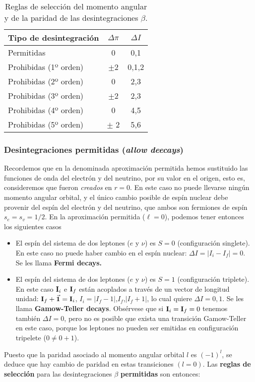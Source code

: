\begin{table}[h!]\centering
	\begin{tabular}{|l||c|c|}\hline
		Tipo de desintegración & $\Delta \pi$ & $\Delta I$ \\ \hline \hline
		Permitidas & 0 & 0,1 \\ \hline 
		Prohibidas (1º orden) & $\pm$2 & 0,1,2 \\ \hline
		Prohibidas (2º orden) & 0 & 2,3 \\ 	\hline	
		Prohibidas (3º orden) & $\pm$2 & 2,3 \\ \hline	
		Prohibidas (4º orden) & 0 & 4,5 \\ 	\hline	
		Prohibidas (5º orden) & $\pm$ 2 & 5,6  \\		 \hline
	\end{tabular}
	\caption{Reglas de selección del momento angular y de la paridad de las desintegraciones $\beta$.}
	\label{Tab:02-02-01}
\end{table}


\subsubsection{Desintegraciones permitidas (\textit{allow deecays})}


Recordemos que en la denominada aproximación permitida hemos sustituido las funciones de onda del electrón y del neutrino, por su valor en el origen, esto es, consideremos que fueron \textit{creados} en $r=0$. En este caso no puede llevarse ningún momento angular orbital, y el único cambio posible de espín nuclear debe provenir del espín del electrón y del neutrino, que ambos son fermiones de espín $s_e=s_v=1/2$. En la aproximación permitida ($\ell=0$), podemos tener entonces los siguientes casos

\begin{itemize}
	\item El espín del sistema de dos leptones ($e$ y $\nu$) es $S=0$ (configuración singlete). En este caso no puede haber cambio en el espín nuclear: $\Delta I=|I_i-I_f|=0$. Se les llama \textbf{Fermi decays.}
	\item El espín del sistema de dos leptones ($e$ y $\nu$) es $S=1$ (configuración triplete). En este caso $\mathbf{I}_i$ e $\mathbf{I}_f$ están acoplados a través de un vector de longitud unidad: $\mathbf{I}_f + \vec{\mathbf{1}} = \mathbf{I}_i$, $I_i=|I_f-1|$,$I_f$,$|I_f+1|$, lo cual quiere $\Delta I = 0,1$. Se les llama \textbf{Gamow-Teller decays}. Obsérvese que si $\mathbf{I}_i=\mathbf{I}_f=0$ tenemos también $\Delta I=0$, pero no es posible que exista una transición Gamow-Teller en este caso, porque los leptones no pueden ser emitidas en configuración tripelete ($0\neq 0+1$).
\end{itemize}
Puesto que la paridad asociado al momento angular orbital $l$ es $(-1)^l$, se deduce que hay cambio de paridad en estas transiciones $(l=0)$. Las \textbf{reglas de selección} para las desintegraciones $\beta$ \textbf{permitidas} son entonces:

